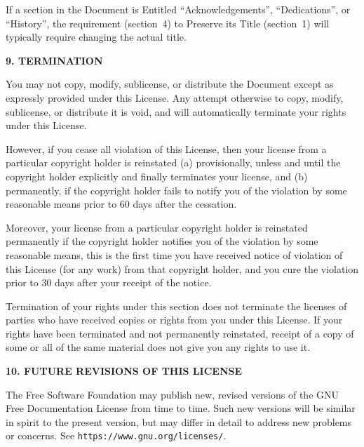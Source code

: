 \documentclass[a4paper,11pt,oneside]{book}
\begin{document}
If a section in the Document is Entitled ``Acknowledgements'',
``Dedications'', or ``History'', the requirement (section~4) to Preserve
its Title (section~1) will typically require changing the actual
title.


\begin{center}
	{\Large\bf 9. TERMINATION\par}
\end{center}


You may not copy, modify, sublicense, or distribute the Document
except as expressly provided under this License.  Any attempt
otherwise to copy, modify, sublicense, or distribute it is void, and
will automatically terminate your rights under this License.

However, if you cease all violation of this License, then your license
from a particular copyright holder is reinstated (a) provisionally,
unless and until the copyright holder explicitly and finally
terminates your license, and (b) permanently, if the copyright holder
fails to notify you of the violation by some reasonable means prior to
60 days after the cessation.

Moreover, your license from a particular copyright holder is
reinstated permanently if the copyright holder notifies you of the
violation by some reasonable means, this is the first time you have
received notice of violation of this License (for any work) from that
copyright holder, and you cure the violation prior to 30 days after
your receipt of the notice.

Termination of your rights under this section does not terminate the
licenses of parties who have received copies or rights from you under
this License.  If your rights have been terminated and not permanently
reinstated, receipt of a copy of some or all of the same material does
not give you any rights to use it.


\begin{center}
	{\Large\bf 10. FUTURE REVISIONS OF THIS LICENSE\par}
\end{center}


The Free Software Foundation may publish new, revised versions
of the GNU Free Documentation License from time to time.  Such new
versions will be similar in spirit to the present version, but may
differ in detail to address new problems or concerns.  See
\texttt{https://www.gnu.org/licenses/}.
\end{document}
